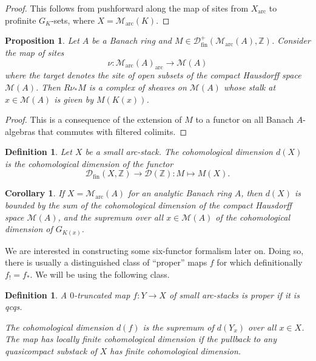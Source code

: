\documentclass[11pt]{amsart}
\numberwithin{equation}{section}
\numberwithin{theorem}{section}
\newtheorem{corollary}[theorem]{Corollary}
\newtheorem{proposition}[theorem]{Proposition}
\newtheorem{definition}[theorem]{Definition}
\theoremstyle{definition}
\begin{document}
\begin{proof} This follows from pushforward along the map of sites from $X_{\mathrm{arc}}$ to profinite $G_K$-sets, where $X=\mathcal M_{\mathrm{arc}}(K)$.
\end{proof}

\begin{proposition} Let $A$ be a Banach ring and $M\in \mathcal D_{\mathrm{fin}}^+(\mathcal M_{\mathrm{arc}}(A),\mathbb Z)$. Consider the map of sites
\[
\nu: \mathcal M_{\mathrm{arc}}(A)_{\mathrm{arc}}\to \mathcal M(A)
\]
where the target denotes the site of open subsets of the compact Hausdorff space $\mathcal M(A)$. Then $R\nu_\ast M$ is a complex of sheaves on $\mathcal M(A)$ whose stalk at $x\in \mathcal M(A)$ is given by $M(K(x))$.
\end{proposition}

\begin{proof} This is a consequence of the extension of $M$ to a functor on all Banach $A$-algebras that commutes with filtered colimits.
\end{proof}

\begin{definition} Let $X$ be a small arc-stack. The cohomological dimension $d(X)$ is the cohomological dimension of the functor
\[
\mathcal D_{\mathrm{fin}}(X,\mathbb Z)\to \mathcal D(\mathbb Z): M\mapsto M(X).
\]
\end{definition}

\begin{corollary} If $X=\mathcal M_{\mathrm{arc}}(A)$ for an analytic Banach ring $A$, then $d(X)$ is bounded by the sum of the cohomological dimension of the compact Hausdorff space $\mathcal M(A)$, and the supremum over all $x\in \mathcal M(A)$ of the cohomological dimension of $G_{K(x)}$.
\end{corollary}

We are interested in constructing some six-functor formalism later on. Doing so, there is usually a distinguished class of ``proper'' maps $f$ for which definitionally $f_!=f_\ast$. We will be using the following class.

\begin{definition} A $0$-truncated map $f: Y\to X$ of small arc-stacks is proper if it is qcqs.

The cohomological dimension $d(f)$ is the supremum of $d(Y_x)$ over all $x\in X$. The map has locally finite cohomological dimension if the pullback to any quasicompact substack of $X$ has finite cohomological dimension.
\end{definition}
\end{document}
